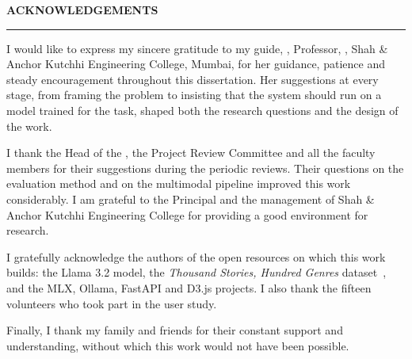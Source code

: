 \thispagestyle{empty}

\begin{center}
{\Large {\bf \uppercase{Acknowledgements}}}
\end{center}

\vspace{\baselineskip}
\hrule
\vspace{2\baselineskip}

\begingroup
\setlength{\parskip}{10pt}
I would like to express my sincere gratitude to my guide, \mysupervisor, Professor, \mydep, Shah \& Anchor Kutchhi Engineering College, Mumbai, for her guidance, patience and steady encouragement throughout this dissertation. Her suggestions at every stage, from framing the problem to insisting that the system should run on a model trained for the task, shaped both the research questions and the design of the work.

I thank the Head of the \mydep{}, the Project Review Committee and all the faculty members for their suggestions during the periodic reviews. Their questions on the evaluation method and on the multimodal pipeline improved this work considerably. I am grateful to the Principal and the management of Shah \& Anchor Kutchhi Engineering College for providing a good environment for research.

I gratefully acknowledge the authors of the open resources on which this work builds: the Llama 3.2 model, the \emph{Thousand Stories, Hundred Genres} dataset~\cite{khan2023stories}, and the MLX, Ollama, FastAPI and D3.js projects. I also thank the fifteen volunteers who took part in the user study.

Finally, I thank my family and friends for their constant support and understanding, without which this work would not have been possible.

\endgroup

\vspace{2\baselineskip}

\hfill \myname

\hfill \myrollno

\newpage
